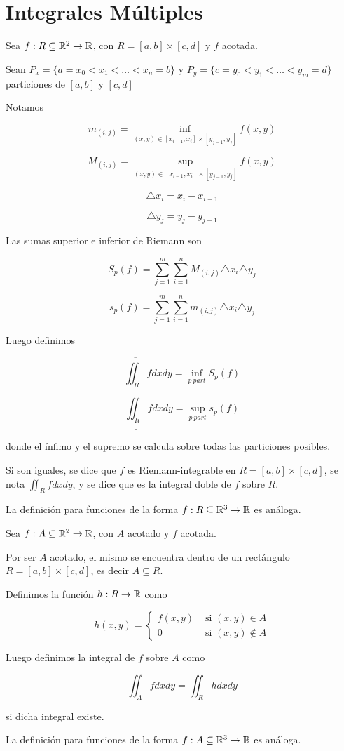 
\chapter{Integrales Múltiples}

\begin{definition}
Sea $f : R \subseteq \mathbb{R}^2 \to \mathbb{R} $, con $R = [a,b] \times [c,d]$ y $f$ acotada.

Sean $ P_x = \{ a = x_0 < x_1 < \ldots < x_n = b \}$ y $ P_y = \{ c = y_0 < y_1 < \ldots < y_m = d \}$ particiones de $[a,b]$ y $[c,d]$

Notamos

$$ m_{(i,j)} = \inf_{(x,y) \in [x_{i-1}, x_i] \times [y_{j-1}, y_j]} f(x,y) $$

$$ M_{(i,j)} = \sup_{(x,y) \in [x_{i-1}, x_i] \times [y_{j-1}, y_j]} f(x,y) $$

$$ \triangle x_i = x_i - x_{i-1}$$

$$ \triangle y_j = y_j - y_{j-1}$$

Las sumas superior e inferior de Riemann son

$$ S_p(f) = \sum_{j=1}^m \sum_{i=1}^n M_{(i,j)} \triangle x_i \triangle y_j$$

$$ s_p(f) = \sum_{j=1}^m \sum_{i=1}^n m_{(i,j)} \triangle x_i \triangle y_j$$

Luego definimos

$$ \overline{\iint_R} f dxdy = \inf_{p \ part} S_p(f)$$

$$ \underline{\iint_R} f dxdy = \sup_{p \ part} s_p(f)$$

donde el ínfimo y el supremo se calcula sobre todas las particiones posibles.

Si son iguales, se dice que $f$ es Riemann-integrable en $R = [a,b] \times [c,d]$, se nota $ \iint_R f dxdy$, y se dice que es la integral doble de $f$ sobre $R$.

La definición para funciones de la forma $f : R \subseteq \mathbb{R}^3 \to \mathbb{R} $ es análoga.
\end{definition}

\begin{definition}
Sea $f : A \subseteq \mathbb{R}^2 \to \mathbb{R} $, con $A$ acotado y $f$ acotada.

Por ser $A$ acotado, el mismo se encuentra dentro de un rectángulo $R = [a,b] \times [c,d]$, es decir $A \subseteq R$.  

Definimos la función $h : R \to \mathbb{R}$ como

$$ h(x,y) = \begin{cases} f(x,y) & \textrm{ si } (x,y) \in A \\ 0 & \textrm{ si } (x,y) \not\in A \end{cases} $$

Luego definimos la integral de $f$ sobre $A$ como

$$ \iint_A f dxdy = \iint_R h dxdy $$

si dicha integral existe.

La definición para funciones de la forma $f : A \subseteq \mathbb{R}^3 \to \mathbb{R} $ es análoga.
\end{definition}

